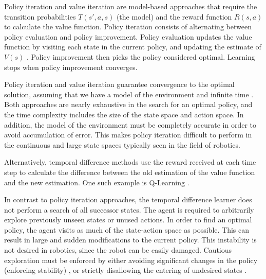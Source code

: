 \documentclass{article}
\begin{document}
Policy iteration and value iteration are model-based approaches that require the transition probabilities $T(s',a,s)$ (the model) and the reward function $R(s,a)$ to calculate the value function. Policy iteration consists of alternating between policy evaluation and policy improvement. Policy evaluation updates the value function by visiting each state in the current policy, and updating the estimate of $V(s)$ \cite{Braziunas03pomdpsolution}. Policy improvement then picks the policy considered optimal. Learning stops when policy improvement converges.

Policy iteration and value iteration guarantee convergence to the optimal solution, assuming that we have a model of the environment and infinite time \cite{Russell:2009:AIM:1671238}. Both approaches are nearly exhaustive in the search for an optimal policy, and the time complexity includes the size of the state space and action space. In addition, the model of the environment must be completely accurate in order to avoid accumulation of error. This makes policy iteration difficult to perform in the continuous and large state spaces typically seen in the field of robotics.

Alternatively, temporal difference methods use the reward received at each time step to calculate the difference between the old estimation of the value function and the new estimation. One such example is Q-Learning \cite{Sutton98reinforcementlearning}.



In contrast to policy iteration approaches, the temporal difference learner does not perform a search of all successor states. The agent is required to arbitrarily explore previously unseen states or unused actions. In order to find an optimal policy, the agent visits as much of the state-action space as possible. This can result in large and sudden modifications to the current policy. This instability is not desired in robotics, since the robot can be easily damaged. Cautious exploration must be enforced by either avoiding significant changes in the policy (enforcing stability) \cite{Peters+MA:2010}, or strictly disallowing the entering of undesired states \cite{conf/rss/DeisenrothRF11}.
\end{document}
